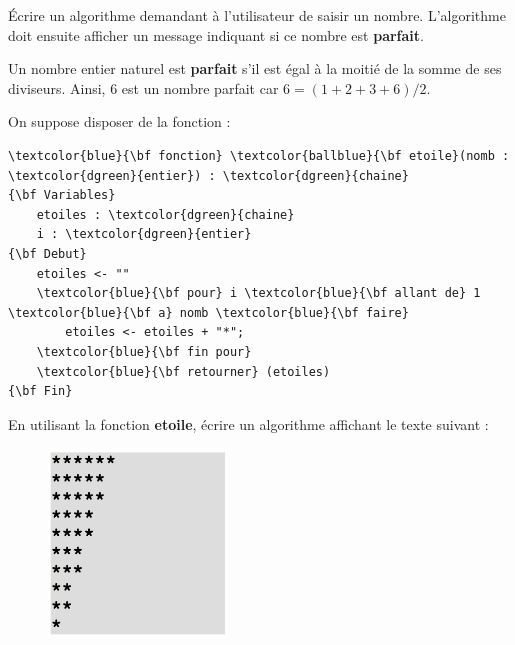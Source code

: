 \documentclass[11pt]{exam}
\begin{document}
\begin{questions}

\question \'Ecrire un algorithme demandant \`a l'utilisateur de saisir un nombre. L'algorithme doit ensuite afficher un message indiquant si ce nombre est \textbf{parfait}.

Un nombre entier naturel est \textbf{parfait} s'il est \'egal \`a la moiti\'e de la somme de ses diviseurs. Ainsi, 6 est un nombre parfait car $6 = \left(1 + 2 + 3 + 6\right) / 2$.

\question On suppose disposer de la fonction :

\begin{Verbatim}
\textcolor{blue}{\bf fonction} \textcolor{ballblue}{\bf etoile}(nomb : \textcolor{dgreen}{entier}) : \textcolor{dgreen}{chaine}
{\bf Variables}
	etoiles : \textcolor{dgreen}{chaine}
	i : \textcolor{dgreen}{entier}
{\bf Debut}
	etoiles <- ""
	\textcolor{blue}{\bf pour} i \textcolor{blue}{\bf allant de} 1 \textcolor{blue}{\bf a} nomb \textcolor{blue}{\bf faire} 
		etoiles <- etoiles + "*"; 
	\textcolor{blue}{\bf fin pour}
	\textcolor{blue}{\bf retourner} (etoiles) 
{\bf Fin}
\end{Verbatim}

En utilisant la fonction \textcolor{ballblue}{\bf etoile}, \'ecrire un algorithme affichant le texte suivant :

\begin{figure}[h!]
\centering
\includegraphics[height=5cm]{out2.png}
\captionsetup{labelformat=empty}
\end{figure}



\end{questions}
\end{document}
